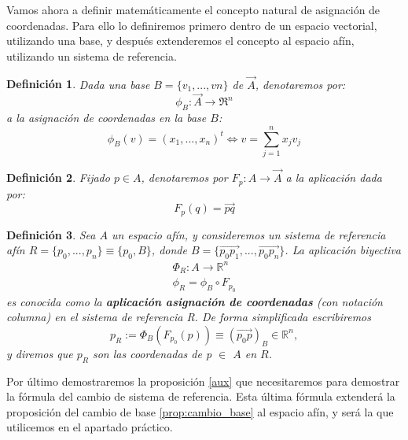 \documentclass[a4paper,11pt, oneside]{book}
\newtheorem{defi}{Definición}
\begin{document}
Vamos ahora a definir matemáticamente el concepto natural de asignación de coordenadas. Para ello lo definiremos primero dentro de un espacio vectorial, utilizando una base, y después extenderemos el concepto al espacio afín, utilizando un sistema de referencia.
\begin{defi}
	Dada una base $B = \{v_1,...,vn\}$ de $\overrightarrow{A}$, denotaremos por:
	\begin{equation}
		\phi_B : \overrightarrow{A} \rightarrow \Re^n
	\end{equation}
	a la asignación de coordenadas en la base $B$:
	\begin{equation}
		\phi_B(v) = (x_1,...,x_n)^t \Leftrightarrow v = \sum_{j=1}^{n}x_jv_j
	\end{equation}
\end{defi}
\begin{defi}
	Fijado $p \in A$, denotaremos por $F_p: A \rightarrow \overrightarrow{A}$ a la aplicación dada por:
	\begin{equation}
		F_p(q) = \overrightarrow{pq}
	\end{equation}
\end{defi}
\begin{defi}
	\label{asignacion}
	Sea $A$ un espacio afín, y consideremos un sistema de referencia afín $R = \{p_0,...,p_n\} \equiv \{p_0, B\}$, donde
	$B = \{\overrightarrow{p_0p_1},...,\overrightarrow{p_0p_n}\}$. La aplicación biyectiva
	\begin{equation}
	\begin{split}
	\Phi_R : A \rightarrow \mathbb R^n \\
	 \phi_R = \phi_B \circ F_{p_0}
	\end{split}
	\end{equation}
	es conocida como la \textbf{aplicación asignación de coordenadas} (con notación columna) en el sistema de referencia R. De forma simplificada escribiremos
	\begin{equation}
	p_R := \Phi_B(F_{p_0}(p)) \equiv (\overrightarrow{p_0p})_B \in \mathbb R^n, 
	\end{equation}
	y diremos que $p_R$ son las coordenadas de p $\in$ $A$ en $R$.
\end{defi}

Por último demostraremos la proposición \ref{aux} que necesitaremos para demostrar la fórmula del cambio de sistema de referencia. Esta última fórmula extenderá la proposición del cambio de base \ref{prop:cambio_base} al espacio afín, y será la que utilicemos en el apartado práctico.
\end{document}
